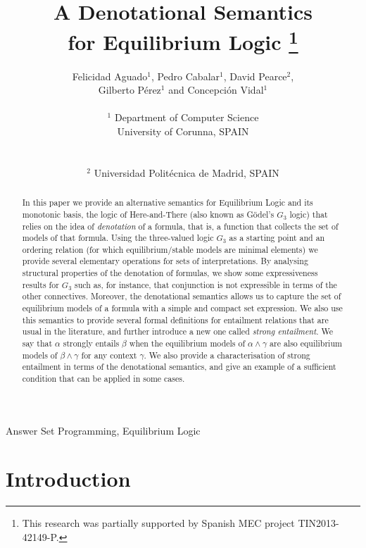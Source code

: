 \documentclass{tlp}
\title[Theory and Practice of Logic Programming]
      {A Denotational Semantics \\ for Equilibrium Logic \thanks{This research was partially supported by Spanish MEC project TIN2013-42149-P.}}
\author[F. Aguado et al]
         {Felicidad Aguado$^1$, Pedro Cabalar$^1$, David Pearce$^2$, \\ 
         {\rm \normalsize Gilberto P\'erez$^1$ and Concepci\'on Vidal$^1$}\\ \\
         $^1$ Department of Computer Science\\
         University of Corunna, SPAIN\\
         \email{\{aguado,cabalar,gperez,eicovima\}@udc.es}\\
\\
         $^2$ Universidad Polit\'ecnica de Madrid, SPAIN\\
         \email{david.pearce@upm.es}
		 }
\begin{document}
\label{firstpage}

\maketitle

\begin{abstract}
In this paper we provide an alternative semantics for Equilibrium Logic and its monotonic basis, the logic of Here-and-There (also known as G\"odel's $G_3$ logic) that relies on the idea of \emph{denotation} of a formula, that is, a function that collects the set of models of that formula. Using the three-valued logic $G_3$ as a starting point and an ordering relation (for which equilibrium/stable models are minimal elements) we provide several elementary operations for sets of interpretations. By analysing structural properties of the denotation of formulas, we show some expressiveness results for $G_3$ such as, for instance, that conjunction is not expressible in terms of the other connectives. Moreover, the denotational semantics allows us to capture the set of equilibrium models of a formula with a simple and compact set expression. We also use this semantics to provide several formal definitions for entailment relations that are usual in the literature, and further introduce a new one called \emph{strong entailment}. We say that $\alpha$ strongly entails $\beta$ when the equilibrium models of $\alpha \wedge \gamma$ are also equilibrium models of $\beta \wedge \gamma$ for any context $\gamma$. We also provide a characterisation of strong entailment in terms of the denotational semantics, and give an example of a sufficient condition that can be applied in some cases.
\end{abstract}

\begin{keywords}
Answer Set Programming, Equilibrium Logic
\end{keywords}

\section{Introduction}
\end{document}
